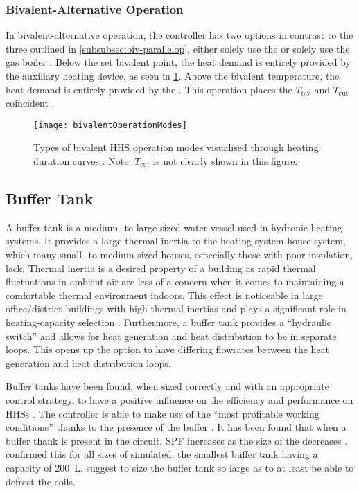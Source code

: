 \subsubsection{Bivalent-Alternative Operation}
In bivalent-alternative operation, the controller has two options in contrast to the three outlined in \cref{subsubsec:biv-parallelop}, either solely use the \HP or solely use the gas boiler \cite{buday_2014}. Below the set bivalent point, the heat demand is entirely provided by the auxiliary heating device, as seen in \cref{fig:bivalentOperationModes}. Above the bivalent temperature, the heat demand is entirely provided by the \HP. This operation places the $T_\text{biv}$ and $T_\text{cut}$ coincident \cite{buday_2014,klein_numerical_2014}. 

\begin{figure}[htb]
    \centering
    \texttt{[image: bivalentOperationModes]}
    \caption[Bivalent operation modes \cite{buday_2014}]{Types of bivalent \ac{HHS} operation modes visualised through heating duration curves \cite{buday_2014}. Note: $T_\text{cut}$ is not clearly shown in this figure.}
    \label{fig:bivalentOperationModes}
\end{figure}

\subsection{Buffer Tank} 
A buffer tank is a medium- to large-sized water vessel used in hydronic heating systems. It provides a large thermal inertia to the heating system-house system, which many small- to medium-sized houses, especially those with poor insulation, lack. Thermal inertia is a desired property of a building as rapid thermal fluctuations in ambient air are less of a concern when it comes to maintaining a comfortable thermal environment indoors. This effect is noticeable in large office/district buildings with high thermal inertias and plays a significant role in heating-capacity selection \cite{owen_ashrae_2009}. Furthermore, a buffer tank provides a ``hydraulic switch'' and allows for heat generation and heat distribution to be in separate loops. This opens up the option to have differing flowrates between the heat generation and heat distribution loops. 

Buffer tanks have been found, when sized correctly and with an appropriate control strategy, to have a positive influence on the efficiency and performance on \acp{HHS} \cite{klein_numerical_2014,roccatello_analysis_2022}. The controller is able to make use of the \HPs ``most profitable working conditions'' thanks to the presence of the buffer \cite{dettorre_economic_2018}. It has been found that when a buffer thank is present in the \HP circuit, \ac{SPF} increases as the size of the \HP decreases \cite{mugnini_variable-load_2021}. \citeauthor{mugnini_variable-load_2021} \cite{mugnini_variable-load_2021} confirmed this for all sizes of \HPs simulated, the smallest buffer tank having a capacity of \SI{200}{\liter}.  \cite{STIEBEL_2012} suggest to size the buffer tank so large as to at least be able to defrost the coils.

